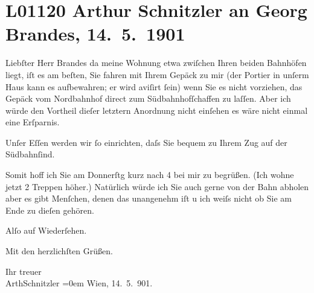 

\section[Arthur Schnitzler an Georg Brandes, 14. 5. 1901]{L01120 Arthur Schnitzler an Georg Brandes, 14. 5. 1901}
\nopagebreak{}
\rehead{ }\normalsize\beginnumbering{}
\toendnotes[C]{\smallbreak\pagebreak[2]}
\pstart{}{\pb}Liebſter Herr Brandes\pend\vspace{0.5em}
\pstart
           da meine Wohnung etwa zwiſchen Ihren beiden Bahnhöfen liegt, iſt es am beſten, Sie
               fahren mit Ihrem Gepäck zu mir (der Portier in unſerm Haus kann es aufbewahren; er
               wird aviſirt ſein) wenn Sie es nicht vorziehen, das Gepäck vom Nordbahnhof direct zum Südbahnhofſchaffen zu laſſen. {\pb}Aber ich würde den Vortheil dieſer letztern
               Anordnung nicht einſehen es wäre nicht einmal eine Erſparnis.\pend
           
\pstart
           Unſer Eſſen werden wir ſo einrichten, daſs Sie bequem zu Ihrem Zug auf der Südbahnſind.\pend
           
\pstart
           Somit hoff ich Sie am Donnerſtg kurz nach 4 bei mir zu
               begrüßen. (Ich wohne jetzt 2 Treppen höher.) Natürlich würde ich Sie auch gerne von
               der Bahn {\pb}abholen aber es gibt Menſchen, denen das
               unangenehm iſt u ich weiſs nicht ob Sie am Ende zu dieſen gehören.\pend
           
\pstart
           Alſo auf Wiederſehen.\pend
           
\pstart
           Mit den herzlichſten Grüßen.\pend
           
\pstart
           Ihr treuer{\\[\baselineskip]}\spacefill\mbox{ArthSchnitzler}\pend
           \leftskip=0em{}
\pstart
           Wien, 14. 5. 901.\pend
           \endnumbering{}  
      